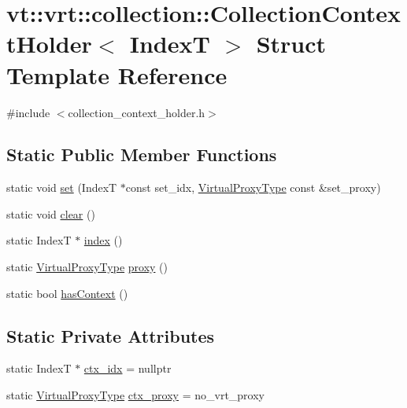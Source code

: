 \hypertarget{structvt_1_1vrt_1_1collection_1_1_collection_context_holder}{}\section{vt\+:\+:vrt\+:\+:collection\+:\+:Collection\+Context\+Holder$<$ IndexT $>$ Struct Template Reference}
\label{structvt_1_1vrt_1_1collection_1_1_collection_context_holder}


{\ttfamily \#include $<$collection\+\_\+context\+\_\+holder.\+h$>$}

\subsection*{Static Public Member Functions}
\begin{DoxyCompactItemize}
\item 
static void \hyperlink{structvt_1_1vrt_1_1collection_1_1_collection_context_holder_a59dd9d6f05f2183934c6dca9394a548a}{set} (IndexT $\ast$const set\+\_\+idx, \hyperlink{namespacevt_a1b417dd5d684f045bb58a0ede70045ac}{Virtual\+Proxy\+Type} const \&set\+\_\+proxy)
\item 
static void \hyperlink{structvt_1_1vrt_1_1collection_1_1_collection_context_holder_aa332e0b283fb66488857c9ed80ecaeb7}{clear} ()
\item 
static IndexT $\ast$ \hyperlink{structvt_1_1vrt_1_1collection_1_1_collection_context_holder_aadf7822ec42e5f2491c50a94f2123ecd}{index} ()
\item 
static \hyperlink{namespacevt_a1b417dd5d684f045bb58a0ede70045ac}{Virtual\+Proxy\+Type} \hyperlink{structvt_1_1vrt_1_1collection_1_1_collection_context_holder_a3221a65e68413ee41042e2d5dea74ef5}{proxy} ()
\item 
static bool \hyperlink{structvt_1_1vrt_1_1collection_1_1_collection_context_holder_ab6a68b761d25786dd17cca35604efcba}{has\+Context} ()
\end{DoxyCompactItemize}
\subsection*{Static Private Attributes}
\begin{DoxyCompactItemize}
\item 
static IndexT $\ast$ \hyperlink{structvt_1_1vrt_1_1collection_1_1_collection_context_holder_a7a11a2c880a15be79b8e2957015bb57f}{ctx\+\_\+idx} = nullptr
\item 
static \hyperlink{namespacevt_a1b417dd5d684f045bb58a0ede70045ac}{Virtual\+Proxy\+Type} \hyperlink{structvt_1_1vrt_1_1collection_1_1_collection_context_holder_ad375fbfa1b642bbff3e824ab56abedb0}{ctx\+\_\+proxy} = no\+\_\+vrt\+\_\+proxy
\end{DoxyCompactItemize}


